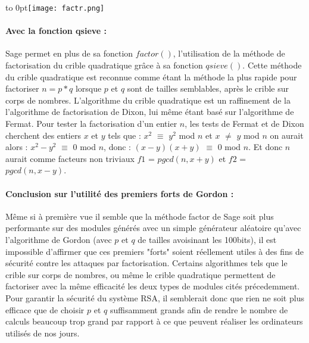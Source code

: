 \documentclass[a4paper,11pt]{article}
\begin{document}
\hfill\hbox to 0pt{\hss\texttt{[image: factr.png]}\hss}\hfill\null


\paragraph{ Avec la fonction qsieve : } \newline
Sage permet en plus de sa fonction $factor()$, l'utilisation de la méthode de factorisation du crible quadratique grâce à sa fonction $qsieve()$. Cette méthode du crible quadratique est reconnue comme étant la méthode la plus rapide pour factoriser $n=p*q$ lorsque $p$ et $q$ sont de tailles semblables, après le crible sur corps de nombres. L'algorithme du crible quadratique est un raffinement de la l'algorithme de factorisation de Dixon, lui même étant basé sur l'algorithme de Fermat.\newline
Pour tester la factorisation d'un entier $n$, les tests de Fermat et de Dixon cherchent des entiers $x$ et $y$ tels que : 
\smallbreak $x^{2}$ $\equiv$ $ y ^{2} $ mod $n$ et $x$ $\ne $ $ y $ mod $n$  \newline on aurait alors :
\smallbreak $x^{2} - y ^{2} $ $\equiv$ $0$ mod $n$, \newline  donc :
\smallbreak $(x-y)(x+y)$  $\equiv$ $0$ mod $n$.
\newline Et donc $n$ aurait comme facteurs non triviaux $f1$ = $pgcd(n,x+y)$ et $f2$ = $pgcd(n,x-y)$.

\paragraph{ Conclusion sur l'utilité des premiers forts de Gordon : }
Même si à première vue il semble  que la méthode factor de Sage soit plus performante sur des modules générés avec un simple générateur aléatoire qu'avec l'algorithme de Gordon (avec $p$ et $q$ de tailles avoisinant les 100bits), il est impossible d'affirmer que ces premiers "forts" soient réellement utiles à des fins de sécurité contre les attaques par factorisation. Certains algorithmes tels que le crible sur corps de nombres, ou même le crible quadratique permettent de factoriser avec la même efficacité les deux types de modules cités précedemment. Pour garantir la sécurité du système RSA, il semblerait donc que rien ne soit plus efficace que de choisir $p$ et $q$ suffisamment grands afin de rendre le nombre de calculs beaucoup trop grand par rapport à ce que peuvent réaliser les ordinateurs utilisés de nos jours.
\end{document}
